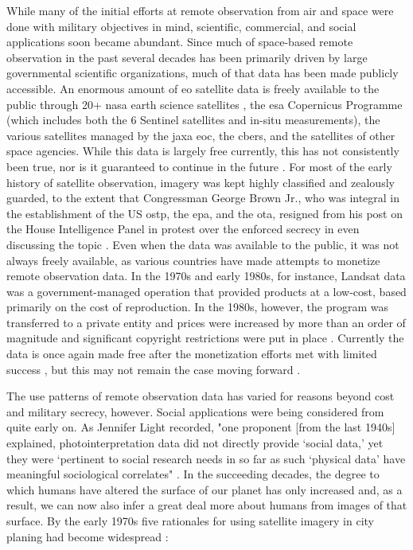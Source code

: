 While many of the initial efforts at remote observation from air and space were done with military objectives in mind, scientific, commercial, and social applications soon became abundant. Since much of space-based remote observation in the past several decades has been primarily driven by large governmental scientific organizations, much of that data has been made publicly accessible. An enormous amount of \ac{eo} satellite data is freely available to the public through 20+ \ac{nasa} earth science satellites \cite{shirahNASAEarthObserving2017}, the \ac{esa} Copernicus Programme (which includes both the 6 Sentinel satellites and in-situ measurements), the various satellites managed by the \ac{jaxa} \ac{eoc}, the \ac{cbers}, and the satellites of other space agencies. While this data is largely free currently, this has not consistently been true, nor is it guaranteed to continue in the future \cite{borowitzOpenSpaceGlobal2017}. For most of the early history of satellite observation, imagery was kept highly classified and zealously guarded, to the extent that Congressman George Brown Jr., who was integral in the establishment of the US \ac{ostp}, the \ac{epa}, and the \ac{ota}, resigned from his post on the House Intelligence Panel in protest over the enforced secrecy in even discussing the topic \cite{healyRepBrownQuits1987, barry1992mappings}. Even when the data was available to the public, it was not always freely available, as various countries have made attempts to monetize remote observation data. In the 1970s and early 1980s, for instance, Landsat data was a government-managed operation that provided products at a low-cost, based primarily on the cost of reproduction. In the 1980s, however, the program was transferred to a private entity and prices were increased by more than an order of magnitude and significant copyright restrictions were put in place \cite{mchaffieManufacturingMetaphors1994}. Currently the data is once again made free after the monetization efforts met with limited success \cite{waldropLandsatCommercializationStumbles1987}, but this may not remain the case moving forward \cite{popkinUSGovernmentConsiders2018}.

The use patterns of remote observation data has varied for reasons beyond cost and military secrecy, however. Social applications were being considered from quite early on. As Jennifer Light recorded, "one proponent [from the last 1940s] explained, photointerpretation data did not directly provide `social data,' yet they were `pertinent to social research needs in so far as such `physical data' have meaningful sociological correlates" \cite{lightWarfareWelfareDefense2005}. In the succeeding decades, the degree to which humans have altered the surface of our planet has only increased and, as a result, we can now also infer a great deal more about humans from images of that surface. By the early 1970s five rationales for using satellite imagery in city planing had become widespread \cite{lightWarfareWelfareDefense2005}:

